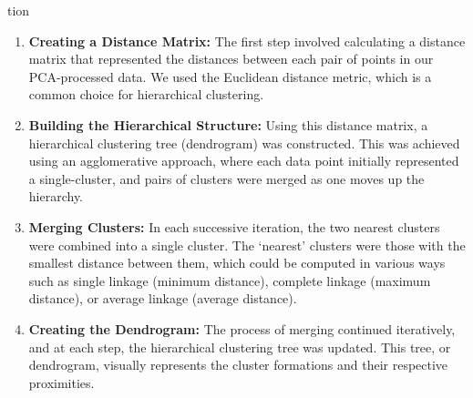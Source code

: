 tion\documentclass[8pt]{article}
\begin{document}
\begin{enumerate}
    \item \textbf{Creating a Distance Matrix:} The first step involved calculating a distance matrix that represented the distances between each pair of points in our PCA-processed data. We used the Euclidean distance metric, which is a common choice for hierarchical clustering.

    \item \textbf{Building the Hierarchical Structure:} Using this distance matrix, a hierarchical clustering tree (dendrogram) was constructed. This was achieved using an agglomerative approach, where each data point initially represented a single-cluster, and pairs of clusters were merged as one moves up the hierarchy.

    \item \textbf{Merging Clusters:} In each successive iteration, the two nearest clusters were combined into a single cluster. The ‘nearest’ clusters were those with the smallest distance between them, which could be computed in various ways such as single linkage (minimum distance), complete linkage (maximum distance), or average linkage (average distance).

    \item \textbf{Creating the Dendrogram:} The process of merging continued iteratively, and at each step, the hierarchical clustering tree was updated. This tree, or dendrogram, visually represents the cluster formations and their respective proximities.


\end{enumerate}
\end{document}
